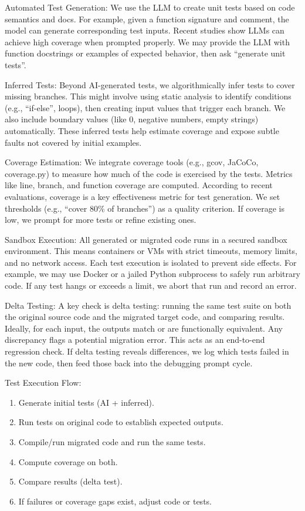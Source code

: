 \documentclass[twocolumn]{article}
\begin{document}
     {Automated Test Generation}: We use the LLM to create unit tests based on code semantics and docs. For example, given a function signature and comment, the model can generate corresponding test inputs. Recent studies show LLMs can achieve high coverage when prompted properly. We may provide the LLM with function docstrings or examples of expected behavior, then ask ``generate unit tests''.

     {Inferred Tests}: Beyond AI-generated tests, we algorithmically infer tests to cover missing branches. This might involve using static analysis to identify conditions (e.g., ``if-else'', loops), then creating input values that trigger each branch. We also include boundary values (like 0, negative numbers, empty strings) automatically. These inferred tests help estimate coverage and expose subtle faults not covered by initial examples.

     {Coverage Estimation}: We integrate coverage tools (e.g., gcov, JaCoCo, coverage.py) to measure how much of the code is exercised by the tests. Metrics like line, branch, and function coverage are computed. According to recent evaluations, coverage is a key effectiveness metric for test generation. We set thresholds (e.g., ``cover 80\% of branches'') as a quality criterion. If coverage is low, we prompt for more tests or refine existing ones.

     {Sandbox Execution}: All generated or migrated code runs in a secured sandbox environment. This means containers or VMs with strict timeouts, memory limits, and no network access. Each test execution is isolated to prevent side effects. For example, we may use Docker or a jailed Python subprocess to safely run arbitrary code. If any test hangs or exceeds a limit, we abort that run and record an error.

     {Delta Testing}: A key check is delta testing: running the same test suite on both the original source code and the migrated target code, and comparing results. Ideally, for each input, the outputs match or are functionally equivalent. Any discrepancy flags a potential migration error. This acts as an end-to-end regression check. If delta testing reveals differences, we log which tests failed in the new code, then feed those back into the debugging prompt cycle.

     {Test Execution Flow}:
    \begin{enumerate}
        \item Generate initial tests (AI + inferred).
        \item Run tests on original code to establish expected outputs.
        \item Compile/run migrated code and run the same tests.
        \item Compute coverage on both.
        \item Compare results (delta test).
        \item If failures or coverage gaps exist, adjust code or tests.
    \end{enumerate}
\end{document}
